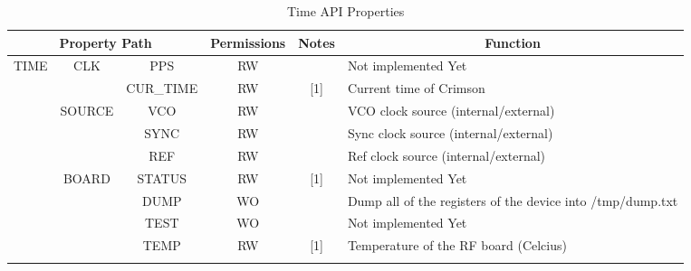 \documentclass[11pt]{article}
\begin{document}
{\begin{landscape}
\begin{table}[H]
\centering
\small
\caption{Time API Properties}
\label{table:time-api}
\begin{tabular}{|c|c|c|c|c|c|l|}
\hline
\multicolumn{4}{|c|}{{\bf Property Path}}                                             & {\bf Permissions} & {\bf Notes} & \multicolumn{1}{c|}{{\bf Function}}                                   \\ \hline
\multirow{15}{*}{TIME} & \multirow{2}{*}{CLK}    & \multicolumn{2}{c|}{PPS}           & RW                &             & Not implemented Yet                                                   \\ \cline{3-7} 
                       &                         & \multicolumn{2}{c|}{CUR\_TIME}     & RW                & [1]         & Current time of Crimson                                               \\ \cline{2-7} 
                       & \multirow{3}{*}{SOURCE} & \multicolumn{2}{c|}{VCO}           & RW                &             & VCO clock source (internal/external)                                  \\ \cline{3-7} 
                       &                         & \multicolumn{2}{c|}{SYNC}          & RW                &             & Sync clock source (internal/external)                                 \\ \cline{3-7} 
                       &                         & \multicolumn{2}{c|}{REF}           & RW                &             & Ref clock source (internal/external)                                  \\ \cline{2-7} 
                       & \multirow{5}{*}{BOARD}  & \multicolumn{2}{c|}{STATUS}        & RW                & [1]         & Not implemented Yet                                                   \\ \cline{3-7} 
                       &                         & \multicolumn{2}{c|}{DUMP}          & WO                &             & Dump all of the registers of the device into /tmp/dump.txt            \\ \cline{3-7} 
                       &                         & \multicolumn{2}{c|}{TEST}          & WO                &             & Not implemented Yet                                                   \\ \cline{3-7} 
                       &                         & \multicolumn{2}{c|}{TEMP}          & RW                & [1]         & Temperature of the RF board (Celcius)                                 \\ \cline{3-7} 

\end{tabular}
\end{table}
\end{landscape}}
\end{document}

